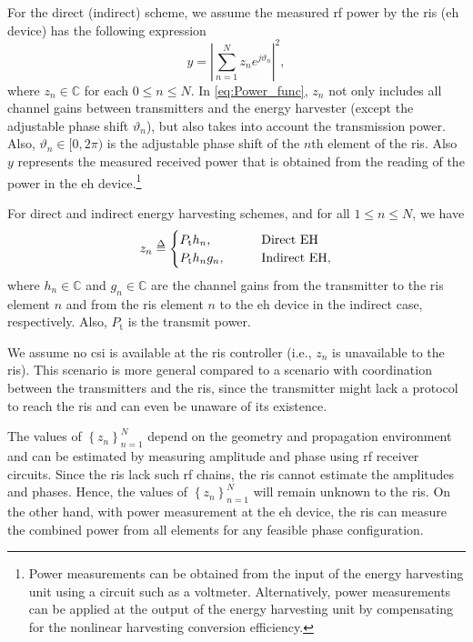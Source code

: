 \documentclass[conference]{IEEEtran}
\begin{document}
For the direct (indirect) scheme, we assume the measured \gls*{rf} power by the \gls*{ris} (\gls*{eh} device) has the following expression \cite{9721205}
\begin{equation}\label{eq:Power_func}
    y =\left|\sum_{n=1}^{N} z_{n}e^{j\vartheta_{n}}\right|^{2},
\end{equation}
where $z_{n}\in\mathbb{C}$ for each $0\leq n\leq N$. In \eqref{eq:Power_func}, $z_{n}$ not only includes all channel gains between transmitters and the energy harvester (except the adjustable phase shift $\vartheta_{n}$), but also takes into account the transmission power. Also, $\vartheta_{n}\in[0, 2\pi)$ is the adjustable phase shift of the $n$th element of the \gls*{ris}. Also $y$ represents the measured received power that is obtained from the reading of the power in the \gls*{eh} device\cite{9721205,haykin2008communication}.\footnote{Power measurements can be obtained from the input of the energy harvesting unit using a circuit such as a voltmeter. Alternatively, power measurements can be applied at the output of the energy harvesting unit by compensating for the nonlinear harvesting conversion efficiency.} 

For direct and indirect energy harvesting schemes, and for all $1\leq n\leq N$, we have
\begin{equation} \label{eq:z_definition}
    z_{n}\delequal\begin{cases}
    P_{\text{t}}h_{n}, \qquad &\text{Direct EH}\\
    P_{\text{t}}h_{n}g_{n}, \qquad &\text{Indirect EH},
    \end{cases}
\end{equation}
where $h_{n}\in \mathbb{C}$ and $g_{n}\in \mathbb{C}$ are the channel gains from the transmitter to the \gls*{ris} element $n$ and from the \gls*{ris} element $n$ to the \gls*{eh} device in the indirect case, respectively. Also, $P_{\text{t}}$ is the transmit power.

We assume no \gls*{csi} is available at the \gls*{ris} controller (i.e., $z_{n}$ is unavailable to the \gls*{ris}). This scenario is more general compared to a scenario with coordination between the transmitters and the \gls*{ris}, since the transmitter might lack a protocol to reach the \gls*{ris} and can even be unaware of its existence.

The values of $\left\{z_{n}\right\}_{n=1}^{N}$ depend on the geometry and propagation environment and can be estimated by measuring amplitude and phase using \gls*{rf} receiver circuits. Since the \gls*{ris} lack such \gls*{rf} chains, the \gls*{ris} cannot estimate the amplitudes and phases. Hence, the values of $\left\{z_{n}\right\}_{n=1}^N$ will remain unknown to the \gls*{ris}. On the other hand, with power measurement at the \gls*{eh} device, the \gls*{ris} can measure the combined power from all elements for any feasible phase configuration. 
\end{document}
